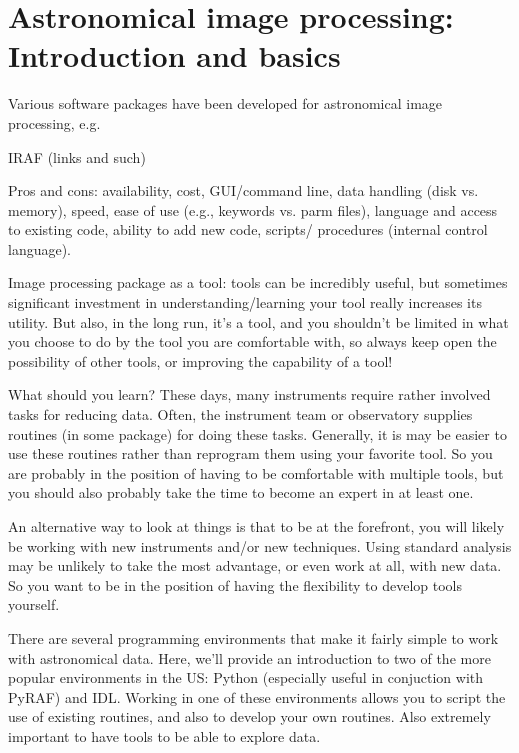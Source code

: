 \documentclass[12pt]{article}
\begin{document}
\section{Astronomical image processing: Introduction and basics}

Various software packages have been developed for astronomical image processing,
e.g.\
\begin{itemize*}
    \item IRAF (links and such)
\end{itemize*}
Pros and cons: availability, cost, GUI/command line, data handling
(disk vs. memory), speed, ease of use (e.g., keywords vs. parm files),
language and access to existing code, ability to add new code,
scripts/ procedures (internal control language).

Image processing package as a tool: tools can be incredibly useful,
but sometimes significant investment in understanding/learning your
tool really increases its utility. But also, in the long run, it's a
tool, and you shouldn't be limited in what you choose to do by the
tool you are comfortable with, so always keep open the possibility of
other tools, or improving the capability of a tool!

What should you learn? These days, many instruments require rather
involved tasks for reducing data. Often, the instrument team or
observatory supplies routines (in some package) for doing these tasks.
Generally, it is may be easier to use these routines rather than
reprogram them using your favorite tool. So you are probably in the
position of having to be comfortable with multiple tools, but you
should also probably take the time to become an expert in at least
one.

An alternative way to look at things is that to be at the forefront,
you will likely be working
with new instruments and/or new techniques. Using standard analysis
may be unlikely to take the most advantage, or even work at all, with
new data. So you want to be in the position of having the flexibility
to develop tools yourself.

There are several programming environments that make it fairly simple
to work with astronomical data. Here, we'll provide an introduction to
two of the more popular environments in the US: Python (especially
useful in conjuction with PyRAF) and IDL. Working in one of these
environments allows you to script the use of existing routines, and
also to develop your own routines. Also extremely important to have
tools to be able to explore data.
\end{document}
